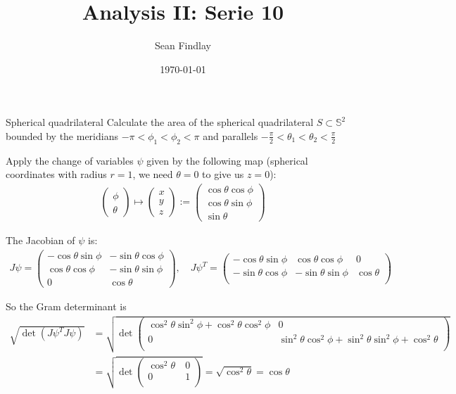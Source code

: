 \documentclass[12pt]{article}
\title{Analysis II: Serie 10}
\author{Sean Findlay}
\date{\today}
\begin{document}
\maketitle

\begin{problem}{Spherical quadrilateral}{}
    Calculate the area of the spherical quadrilateral $S \subset \mathbb{S}^2$ bounded by the meridians $-\pi < \phi_1 < \phi_2 < \pi$ and parallels $-\frac{\pi}{2} < \theta_1 < \theta_2 < \frac{\pi}{2}$
\end{problem}

Apply the change of variables $\psi$ given by the following map (spherical coordinates with radius $r = 1$, we need $\theta = 0$ to give us $z = 0$):
\begin{align*}
    \begin{pmatrix} \phi \\ \theta \end{pmatrix} \mapsto \begin{pmatrix} x \\ y \\ z \end{pmatrix} := \begin{pmatrix} \cos\theta \cos\phi \\ \cos\theta\sin\phi \\ \sin\theta \end{pmatrix}
\end{align*}

The Jacobian of $\psi$ is:
\begin{align*}
    J\psi = 
    \begin{pmatrix}
        -\cos\theta\sin\phi & -\sin\theta\cos\phi \\
        \cos\theta\cos\phi & -\sin\theta\sin\phi \\
        0 & \cos\theta
    \end{pmatrix}, \quad J\psi^T = 
    \begin{pmatrix}
        -\cos\theta\sin\phi & \cos\theta\cos\phi & 0 \\
        -\sin\theta\cos\phi & -\sin\theta\sin\phi & \cos\theta \\
    \end{pmatrix}
\end{align*}

So the Gram determinant is
\begin{align*}
    \sqrt{\det(J \psi^T J\psi)} &= \sqrt{\det
    \begin{pmatrix}
        \cos^2\theta\sin^2\phi + \cos^2\theta\cos^2\phi & 0 \\
        0 & \sin^2\theta\cos^2\phi + \sin^2\theta\sin^2\phi + \cos^2\theta \\
    \end{pmatrix}} \\
    &= \sqrt{\det
    \begin{pmatrix}
        \cos^2\theta\ & 0 \\
        0 & 1 \\
    \end{pmatrix}} = \sqrt{\cos^2\theta} = \cos\theta
\end{align*}
\end{document}
